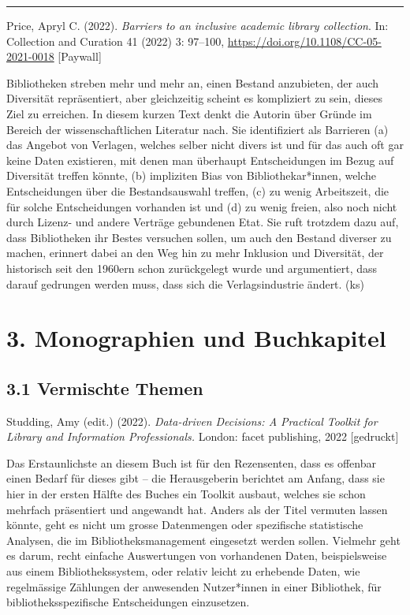 \documentclass[a4paper,
fontsize=11pt,
oneside,
numbers=noperiodatend,
parskip=half-,
bibliography=totoc,
final
]{scrartcl}
\begin{document}
\begin{center}\rule{0.5\linewidth}{0.5pt}\end{center}

Price, Apryl C. (2022). \emph{Barriers to an inclusive academic library
collection}. In: Collection and Curation 41 (2022) 3: 97--100,
\url{https://doi.org/10.1108/CC-05-2021-0018} {[}Paywall{]}

Bibliotheken streben mehr und mehr an, einen Bestand anzubieten, der
auch Diversität repräsentiert, aber gleichzeitig scheint es kompliziert
zu sein, dieses Ziel zu erreichen. In diesem kurzen Text denkt die
Autorin über Gründe im Bereich der wissenschaftlichen Literatur nach.
Sie identifiziert als Barrieren (a) das Angebot von Verlagen, welches
selber nicht divers ist und für das auch oft gar keine Daten existieren,
mit denen man überhaupt Entscheidungen im Bezug auf Diversität treffen
könnte, (b) impliziten Bias von Bibliothekar*innen, welche
Entscheidungen über die Bestandsauswahl treffen, (c) zu wenig
Arbeitszeit, die für solche Entscheidungen vorhanden ist und (d) zu
wenig freien, also noch nicht durch Lizenz- und andere Verträge
gebundenen Etat. Sie ruft trotzdem dazu auf, dass Bibliotheken ihr
Bestes versuchen sollen, um auch den Bestand diverser zu machen,
erinnert dabei an den Weg hin zu mehr Inklusion und Diversität, der
historisch seit den 1960ern schon zurückgelegt wurde und argumentiert,
dass darauf gedrungen werden muss, dass sich die Verlagsindustrie
ändert. (ks)

\pagebreak 

\hypertarget{monographien-und-buchkapitel}{%
\section{3. Monographien und
Buchkapitel}\label{monographien-und-buchkapitel}}

\hypertarget{vermischte-themen-1}{%
\subsection{3.1 Vermischte Themen}\label{vermischte-themen-1}}

Studding, Amy (edit.) (2022). \emph{Data-driven Decisions: A Practical
Toolkit for Library and Information Professionals.} London: facet
publishing, 2022 {[}gedruckt{]}

Das Erstaunlichste an diesem Buch ist für den Rezensenten, dass es
offenbar einen Bedarf für dieses gibt -- die Herausgeberin berichtet am
Anfang, dass sie hier in der ersten Hälfte des Buches ein Toolkit
ausbaut, welches sie schon mehrfach präsentiert und angewandt hat.
Anders als der Titel vermuten lassen könnte, geht es nicht um grosse
Datenmengen oder spezifische statistische Analysen, die im
Bibliotheksmanagement eingesetzt werden sollen. Vielmehr geht es darum,
recht einfache Auswertungen von vorhandenen Daten, beispielsweise aus
einem Bibliothekssystem, oder relativ leicht zu erhebende Daten, wie
regelmässige Zählungen der anwesenden Nutzer*innen in einer Bibliothek,
für bibliotheksspezifische Entscheidungen einzusetzen.
\end{document}
